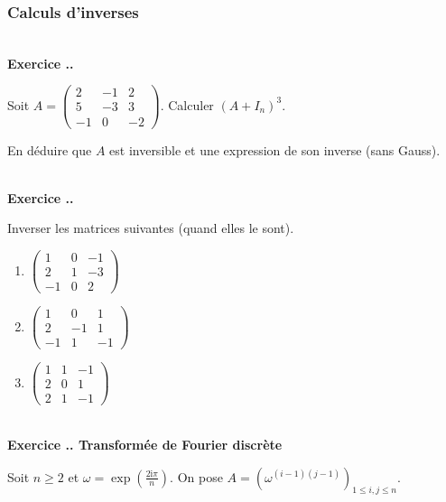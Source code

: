 \documentclass{article}
\newcommand{\im}{\text{i}}
\newcounter{exo}
\newcommand{\exercice}[1][\null]{\textbf{\\ Exercice \thesection.\theexo. #1} \addtocounter{exo}{1}}
\begin{document}
\subsubsection{Calculs d'inverses}




\exercice

Soit $A = \begin{pmatrix} 2 & -1 & 2 \\ 5& -3& 3 \\ -1 & 0 & -2 \end{pmatrix}$. Calculer $(A+I_n)^3$.

En déduire que $A$ est inversible et une expression de son inverse (sans Gauss).




\exercice

Inverser les matrices suivantes (quand elles le sont).

\begin{multicols}{3}

\begin{enumerate}

\item $ \begin{pmatrix} 1 & 0 & -1 \\ 2 & 1 & -3 \\ -1 & 0 & 2 \end{pmatrix}$

\item $ \begin{pmatrix}  1 & 0 & 1 \\ 2 & -1 & 1 \\ -1 & 1 & -1 \end{pmatrix}$

\item $ \begin{pmatrix}  1 & 1 & -1 \\ 2 & 0 & 1 \\ 2 & 1 & -1 \end{pmatrix}$

\end{enumerate}

\end{multicols}





\exercice[Transformée de Fourier discrète]

Soit $n \ge 2$ et $\omega = \exp(\frac{2\im \pi}{n})$. On pose $A = (\omega^{(i-1)(j-1)})_{1 \le i,j \le n}$.
\end{document}
